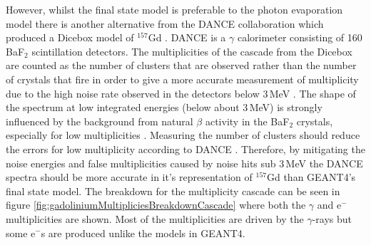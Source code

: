 
However, whilst the final state model is preferable to the photon evaporation model there is another alternative from the DANCE collaboration which produced a Dicebox model of $^{157}$Gd \cite{Chyzh_2011}. DANCE is a $\gamma$ calorimeter consisting of 160 BaF$_2$ scintillation detectors. The multiplicities of the cascade from the Dicebox are counted as the number of clusters that are observed rather than the number of crystals that fire in order to give a more accurate measurement of multiplicity due to the high noise rate observed in the detectors below 3\,MeV \cite{Chyzh_2011}. The shape of the spectrum at low integrated energies (below about 3\,MeV) is strongly influenced by the background from natural $\beta$ activity in the BaF$_2$ crystals, especially for low multiplicities \cite{Chyzh_2011}. Measuring the number of clusters should reduce the errors for low multiplicity according to DANCE \cite{Chyzh_2011}. Therefore, by mitigating the noise energies and false multiplicities caused by noise hits sub 3\,MeV the DANCE spectra should  be more accurate in it's representation of $^{157}$Gd than GEANT4's final state model. The breakdown for the multiplicity cascade can be seen in figure \ref{fig:gadoliniumMultipliciesBreakdownCascade} where both the $\gamma$ and e$^-$ multiplicities are shown. Most of the multiplicities are driven by the $\gamma$-rays but some e$^-$s are produced unlike the models in GEANT4. 
